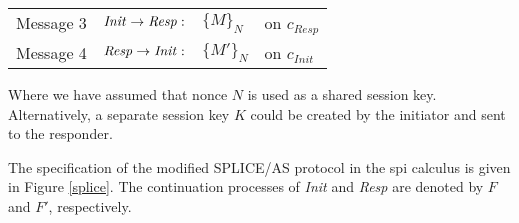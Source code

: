 \documentclass[10pt,a4paper,final,oneside,fleqn]{book}
\begin{document}
\begin{tabular}{llll}
Message 3&\hspace{5mm}$\mbox{{\itshape Init\/}}\to\mbox{{\itshape Resp\/}}:$&$\{M\}_{N}$&on $c_{Resp}$\\
Message 4&\hspace{5mm}$\mbox{{\itshape Resp\/}}\to\mbox{{\itshape Init\/}}:$&$\{M'\}_{N}$&on $c_{Init}$
\end{tabular}\vspace{5mm}

\noindent
Where we have assumed that nonce $N$ is used as a shared session key. Alternatively, a separate session key $K$ could be created by the initiator and sent to the responder.

The specification of the modified SPLICE/AS protocol in the spi calculus is given in Figure \ref{splice}. The continuation processes of {\itshape Init\/} and {\itshape Resp\/} are denoted by $F$ and $F'$, respectively.
\end{document}

